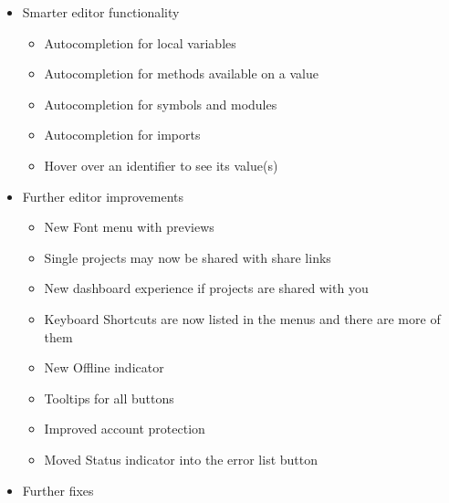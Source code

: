 \begin{itemize}
  \begin{itemize}
  \tightlist
  \item
    New \texttt{\ calc\ } module, \texttt{\ abs\ } , \texttt{\ min\ } ,
    \texttt{\ max\ } , \texttt{\ even\ } , \texttt{\ odd\ } and
    \texttt{\ mod\ } moved there
  \item
    New \texttt{\ message\ } argument on \texttt{\ assert\ } function
  \item
    The \texttt{\ pairs\ } method on dictionaries now returns an array
    of length-2 arrays instead of taking a closure
  \item
    The method call
    \texttt{\ dict\ }{\texttt{\ .\ }}\texttt{\ }{\texttt{\ at\ }}\texttt{\ }{\texttt{\ (\ }}\texttt{\ }{\texttt{\ "key"\ }}\texttt{\ }{\texttt{\ )\ }}\texttt{\ }
    now always fails if \texttt{\ "key"\ } doesn\textquotesingle t exist
    Previously, it was allowed in assignments. Alternatives are
    \texttt{\ dict\ }{\texttt{\ .\ }}\texttt{\ key\ }{\texttt{\ =\ }}\texttt{\ x\ }
    and
    \texttt{\ dict\ }{\texttt{\ .\ }}\texttt{\ }{\texttt{\ insert\ }}\texttt{\ }{\texttt{\ (\ }}\texttt{\ }{\texttt{\ "key"\ }}\texttt{\ }{\texttt{\ ,\ }}\texttt{\ x\ }{\texttt{\ )\ }}\texttt{\ }
    .
  \end{itemize}
\item
  Smarter editor functionality

  \begin{itemize}
  \tightlist
  \item
    Autocompletion for local variables
  \item
    Autocompletion for methods available on a value
  \item
    Autocompletion for symbols and modules
  \item
    Autocompletion for imports
  \item
    Hover over an identifier to see its value(s)
  \end{itemize}
\item
  Further editor improvements

  \begin{itemize}
  \tightlist
  \item
    New Font menu with previews
  \item
    Single projects may now be shared with share links
  \item
    New dashboard experience if projects are shared with you
  \item
    Keyboard Shortcuts are now listed in the menus and there are more of
    them
  \item
    New Offline indicator
  \item
    Tooltips for all buttons
  \item
    Improved account protection
  \item
    Moved Status indicator into the error list button
  \end{itemize}
\item
  Further fixes


\end{itemize}
